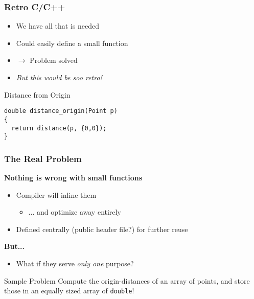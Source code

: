 \begin{frame}[fragile]
  \frametitle{Retro C/C++}

  \begin{itemize}
  \item We have all that is needed
  \item Could easily define a small function
  \item $\to$ Problem solved
  \item \textit{But this would be soo retro!}
  \end{itemize}

  \begin{block}{Distance from Origin}
\begin{verbatim}
double distance_origin(Point p)
{
  return distance(p, {0,0});
}
\end{verbatim}
  \end{block}

\end{frame}

\begin{frame}
  \frametitle{The Real Problem}

  \textbf{Nothing is wrong with small functions}

  \begin{itemize}
  \item Compiler will inline them
    \begin{itemize}
    \item ... and optimize away entirely
    \end{itemize}
  \item Defined centrally (public header file?) for further reuse
  \end{itemize}

  \textbf{But...}

  \begin{itemize}
  \item What if they serve \textit{only one} purpose?
  \end{itemize}

  \begin{block}{Sample Problem}
    Compute the origin-distances of an array of points, and store
    those in an equally sized array of \texttt{double}!
  \end{block}
  
\end{frame}

